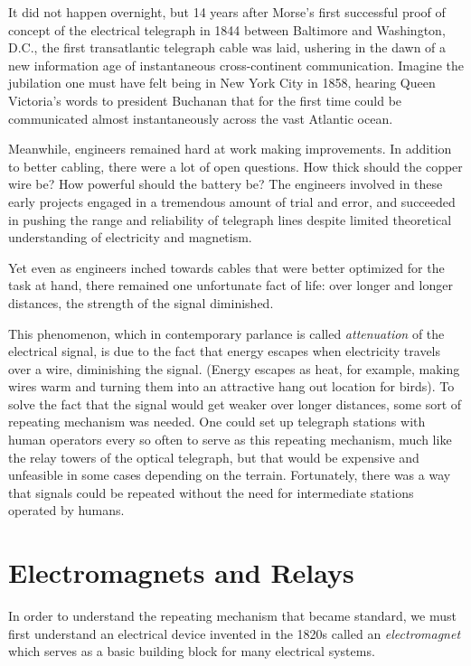 \documentclass[UTF8]{book}
\begin{document}
\begin{CJK}{UTF8}{gbsn}
It did not happen overnight, but 14 years after Morse's first successful proof of concept of the electrical telegraph in 1844 between Baltimore and Washington, D.C., the first transatlantic telegraph cable was laid, ushering in the dawn of a new information age of instantaneous cross-continent communication. Imagine the jubilation one must have felt being in New York City in 1858, hearing Queen Victoria's words to president Buchanan that for the first time could be communicated almost instantaneously across the vast Atlantic ocean.

Meanwhile, engineers remained hard at work making improvements. In addition to better cabling, there were a lot of open questions. How thick should the copper wire be? How powerful should the battery be? The engineers involved in these early projects engaged in a tremendous amount of trial and error, and succeeded in pushing the range and reliability of telegraph lines despite limited theoretical understanding of electricity and magnetism.

Yet even as engineers inched towards cables that were better optimized for the task at hand, there remained one unfortunate fact of life: over longer and longer distances, the strength of the signal diminished.

This phenomenon, which in contemporary parlance is called \emph{attenuation} of the electrical signal, is due to the fact that energy escapes when electricity travels over a wire, diminishing the signal. (Energy escapes as heat, for example, making wires warm and turning them into an attractive hang out location for birds). To solve the fact that the signal would get weaker over longer distances, some sort of repeating mechanism was needed. One could set up telegraph stations with human operators every so often to serve as this repeating mechanism, much like the relay towers of the optical telegraph, but that would be expensive and unfeasible in some cases depending on the terrain. Fortunately, there was a way that signals could be repeated without the need for intermediate stations operated by humans.

\section{Electromagnets and Relays}

In order to understand the repeating mechanism that became standard, we must first understand an electrical device invented in the 1820s called an \emph{electromagnet} which serves as a basic building block for many electrical systems.


\end{CJK}
\end{document}
